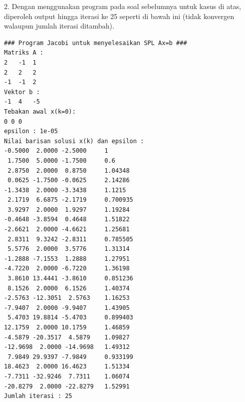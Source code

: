 \documentclass[paper=a4, fontsize=11pt]{scrartcl}
\numberwithin{equation}{section} %
\numberwithin{figure}{section} %
\numberwithin{table}{section} %
\begin{document}
2. Dengan menggunakan program pada soal sebelumnya untuk kasus di atas, diperoleh output hingga iterasi ke 25 seperti di bawah ini (tidak konvergen walaupun jumlah iterasi ditambah).
\begin{small}
\begin{verbatim}
### Program Jacobi untuk menyelesaikan SPL Ax=b ###
Matriks A : 
2	-1	1	
2	2	2	
-1	-1	2	
Vektor b : 
-1	4	-5	
Tebakan awal x(k=0): 
0 0 0 
epsilon : 1e-05
Nilai barisan solusi x(k) dan epsilon : 
-0.5000  2.0000 -2.5000 	1
 1.7500  5.0000 -1.7500 	0.6
 2.8750  2.0000  0.8750 	1.04348
 0.0625 -1.7500 -0.0625 	2.14286
-1.3438  2.0000 -3.3438 	1.1215
 2.1719  6.6875 -2.1719 	0.700935
 3.9297  2.0000  1.9297 	1.19284
-0.4648 -3.8594  0.4648 	1.51822
-2.6621  2.0000 -4.6621 	1.25681
 2.8311  9.3242 -2.8311 	0.785505
 5.5776  2.0000  3.5776 	1.31314
-1.2888 -7.1553  1.2888 	1.27951
-4.7220  2.0000 -6.7220 	1.36198
 3.8610 13.4441 -3.8610 	0.851236
 8.1526  2.0000  6.1526 	1.40374
-2.5763 -12.3051  2.5763 	1.16253
-7.9407  2.0000 -9.9407 	1.43905
 5.4703 19.8814 -5.4703 	0.899403
12.1759  2.0000 10.1759 	1.46859
-4.5879 -20.3517  4.5879 	1.09827
-12.9698  2.0000 -14.9698 	1.49312
 7.9849 29.9397 -7.9849 	0.933199
18.4623  2.0000 16.4623 	1.51334
-7.7311 -32.9246  7.7311 	1.06074
-20.8279  2.0000 -22.8279 	1.52991
Jumlah iterasi : 25
\end{verbatim}
\end{small}
\end{document}
